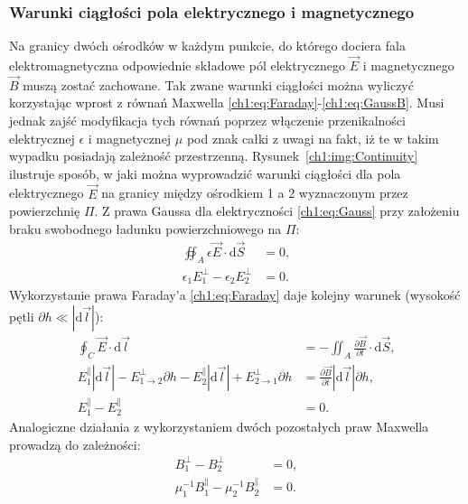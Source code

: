 \subsubsection{Warunki ciągłości pola elektrycznego i magnetycznego }
Na granicy dwóch ośrodków w każdym punkcie, do którego dociera fala elektromagnetyczna odpowiednie składowe pól elektrycznego $\vec{E}$ i magnetycznego $\vec{B}$ muszą zostać zachowane. Tak zwane warunki ciągłości można wyliczyć korzystając wprost z równań Maxwella \eqref{ch1:eq:Faraday}-\eqref{ch1:eq:GaussB}. Musi jednak zajść modyfikacja tych równań poprzez włączenie przenikalności elektrycznej $\epsilon$ i magnetycznej $\mu$ pod znak całki z uwagi na fakt, iż te w takim wypadku posiadają zależność przestrzenną.
Rysunek~\ref{ch1:img:Continuity} ilustruje sposób, w jaki można wyprowadzić warunki ciągłości dla pola elektrycznego $\vec{E}$ na granicy między ośrodkiem 1 a 2 wyznaczonym przez powierzchnię $\Pi$. Z prawa Gaussa dla elektryczności \eqref{ch1:eq:Gauss} przy założeniu braku swobodnego ładunku powierzchniowego na $\Pi$:
\begin{align}
\oiint_A \epsilon\vec{E}\cdot\mathrm{d}\vec{S} &= 0, \nonumber\\
\epsilon_1E_1^\perp - \epsilon_2E_2^\perp &= 0.
\end{align}
Wykorzystanie prawa Faraday'a \eqref{ch1:eq:Faraday} daje kolejny warunek (wysokość pętli $\partial h \ll |\mathrm{d}\vec{l}|$):
\begin{align}
\oint_C\vec{E}\cdot \mathrm{d}\vec{l} &= -\iint_A\frac{\partial\vec{B}}{\partial t}\cdot \mathrm{d}\vec{S},\nonumber\\
E_1^\parallel|\mathrm{d}\vec{l}| - E_{1\rightarrow 2}^\perp\partial h - E_2^\parallel|\mathrm{d}\vec{l}| + E_{2\rightarrow 1}^\perp\partial h &= \frac{\partial\vec{B}}{\partial t}|\mathrm{d}\vec{l}|\partial h,\nonumber\\
\label{ch1:eq:EParallelContinuity}
E_1^\parallel - E_2^\parallel &= 0.
\end{align}
Analogiczne działania z wykorzystaniem dwóch pozostałych praw Maxwella prowadzą do zależności:
\begin{align}
B_1^\perp - B_2^\perp &= 0,\\
\label{ch1:eq:BParallelContinuity}
\mu_1^{-1}B_1^\parallel - \mu_2^{-1}B_2^\parallel &= 0.
\end{align}
